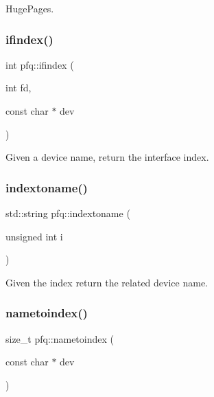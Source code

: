 Huge\+Pages. 

\mbox{\label{namespacepfq_a251ac5cc269aa123009754edf62ab8b4}} 
\subsubsection{\texorpdfstring{ifindex()}{ifindex()}}
{\footnotesize\ttfamily int pfq\+::ifindex (\begin{DoxyParamCaption}\item[{int}]{fd,  }\item[{const char $\ast$}]{dev }\end{DoxyParamCaption})\hspace{0.3cm}{\ttfamily [inline]}}



Given a device name, return the interface index. 

\mbox{\label{namespacepfq_a7bf753b90ae15e20c86f40ba59c87c36}} 
\subsubsection{\texorpdfstring{indextoname()}{indextoname()}}
{\footnotesize\ttfamily std\+::string pfq\+::indextoname (\begin{DoxyParamCaption}\item[{unsigned int}]{i }\end{DoxyParamCaption})\hspace{0.3cm}{\ttfamily [inline]}}



Given the index return the related device name. 

\mbox{\label{namespacepfq_aa68a4c07117073eeb820b32f955dda00}} 
\subsubsection{\texorpdfstring{nametoindex()}{nametoindex()}}
{\footnotesize\ttfamily size\+\_\+t pfq\+::nametoindex (\begin{DoxyParamCaption}\item[{const char $\ast$}]{dev }\end{DoxyParamCaption})\hspace{0.3cm}{\ttfamily [inline]}}



